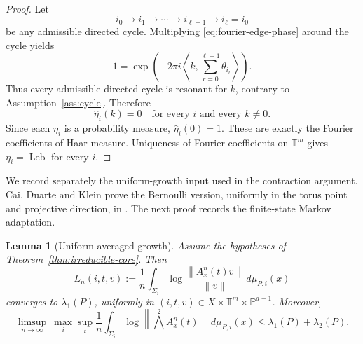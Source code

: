 \documentclass[11pt,a4paper]{amsart}
\newtheorem{lemma}[theorem]{Lemma}
\newcommand{\T}{\mathbb T}
\newcommand{\PP}{\mathbb P}
\newcommand{\Leb}{\operatorname{Leb}}
\newcommand{\norm}[1]{\left\lVert #1\right\rVert}
\begin{document}
\begin{proof}
Let
\[
 i_0\to i_1\to\cdots\to i_{\ell-1}\to i_\ell=i_0
\]
be any admissible directed cycle.  Multiplying
\eqref{eq:fourier-edge-phase} around the cycle yields
\[
 1=
 \exp\left(
 -2\pi i
 \left\langle k,
 \sum_{r=0}^{\ell-1}\theta_{i_r}
 \right\rangle\right).
\]
Thus every admissible directed cycle is resonant for \(k\), contrary
to Assumption~\ref{ass:cycle}.  Therefore
\[
 \widehat\eta_i(k)=0
 \quad\text{for every }i\text{ and every }k\ne0.
\]
Since each \(\eta_i\) is a probability measure,
\(\widehat\eta_i(0)=1\).  These are exactly the Fourier coefficients
of Haar measure.  Uniqueness of Fourier coefficients on \(\T^m\)
gives \(\eta_i=\Leb\) for every \(i\).
\end{proof}



We record separately the uniform-growth input used in the contraction
argument.  Cai, Duarte and Klein prove the Bernoulli version, uniformly
in the torus point and projective direction, in
\cite[Theorem~5.4]{CDK}.  The next proof records the finite-state
Markov adaptation.%

\begin{lemma}[Uniform averaged growth]\label{lem:uniform-growth}
Assume the hypotheses of
Theorem~\ref{thm:irreducible-core}.  Then
\[
 L_n(i,t,v):=
 \frac1n\int_{\Sigma_i}
 \log\frac{\norm{A_x^n(t)v}}{\norm v}\,d\mu_{P,i}(x)
\]
converges to \(\lambda_1(P)\), uniformly in
\((i,t,v)\in X\times\T^m\times\PP^{d-1}\).  Moreover,
\[
 \limsup_{n\to\infty}\ 
 \max_i\sup_t\frac1n
 \int_{\Sigma_i}
 \log\norm{\textstyle\bigwedge^2 A_x^n(t)}
 \,d\mu_{P,i}(x)
 \le\lambda_1(P)+\lambda_2(P).
\]
\end{lemma}
\end{document}
